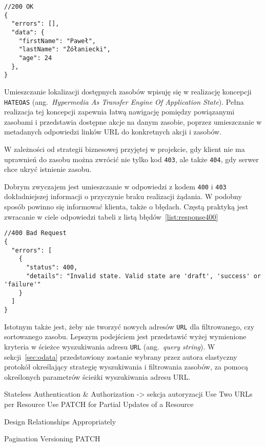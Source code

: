 {\belowcaptionskip=-10pt
\begin{lstlisting}[label=list:response200,
    caption=Przykład pomyślnej odpowiedzi serwera]
//200 OK
{
  "errors": [],
  "data": {
    "firstName": "Paweł",
    "lastName": "Żółaniecki",
    "age": 24
  },
}
\end{lstlisting}
}

Umieszczanie lokalizacji dostępnych zasobów wpisuję się w realizację koncepcji \texttt{HATEOAS} (ang.~\emph{Hypermedia As Transfer Engine Of Application State}). Pełna realizacja tej koncepcji zapewnia łatwą nawigację pomiędzy powiązanymi zasobami i przedstawia dostępne akcje na danym zasobie, poprzez umieszczanie w metadanych odpowiedzi linków URL do konkretnych akcji i zasobów.

W zależności od strategii biznesowej przyjętej w projekcie, gdy klient nie ma uprawnień do zasobu można zwrócić nie tylko kod \texttt{403}, ale także \texttt{404}, gdy serwer chce ukryć istnienie zasobu.

Dobrym zwyczajem jest umieszczanie w odpowiedzi z kodem \texttt{400} i \texttt{403} dokładniejszej informacji o przyczynie braku realizacji żądania. W podobny sposób powinno się informować klienta, także o błędach. Częstą praktyką jest zwracanie w ciele odpowiedzi tabeli z listą błędów~\ref{list:response400}

{\belowcaptionskip=-10pt
\begin{lstlisting}[label=list:response400,
    caption=Odpowiedź serwera zawierająca opis błędu]
//400 Bad Request
{
  "errors": [
    {
      "status": 400,
      "details": "Invalid state. Valid state are 'draft', 'success' or 'failure'"
    }
  ]
}
\end{lstlisting}
}

Istotnym także jest, żeby nie tworzyć nowych adresów \texttt{URL} dla filtrowanego, czy sortowanego zasobu. Lepszym podejściem jest przedstawić wyżej wymienione kryteria w ścieżce wyszukiwania adresu \texttt{URL} (ang.~\emph{query string}). W sekcji~\ref{sec:odata} przedstawiony zostanie wybrany przez autora elastyczny protokół określający strategię wyszukiwania i filtrowania zasobów, za pomocą określonych parametrów ścieżki wyszukiwania adresu URL.


Stateless Authentication & Authorization -> sekcja autoryzacji
Use Two URLs per Resource
Use PATCH for Partial Updates of a Resource 


Design Relationships Appropriately 

Pagination Versioning PATCH

